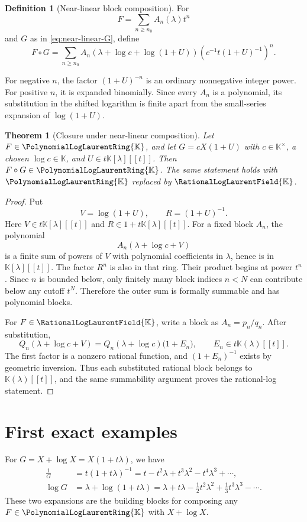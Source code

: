 \documentclass[11pt,openany]{book}
\theoremstyle{definition}
\newtheorem{definition}{Definition}[chapter]
\theoremstyle{plain}
\newtheorem{theorem}{Theorem}[chapter]
\theoremstyle{remark}
\newcommand{\K}{\mathbb{K}}
\newcommand{\Plog}{\PolynomialLogLaurentRing{\K}}
\newcommand{\Rlog}{\RationalLogLaurentField{\K}}
\begin{document}
\begin{definition}[Near-linear block composition]\label{def:near-linear-composition}
For
\[
 F=\sum_{n\ge n_0}A_n(\lambda)t^n
\]
and \(G\) as in \cref{eq:near-linear-G}, define
\begin{equation}\label{eq:exact-block-composition}
 F\circ G
 =\sum_{n\ge n_0}
 A_n\!\left(\lambda+\log c+\log(1+U)\right)
 \left(c^{-1}t(1+U)^{-1}\right)^n.
\end{equation}
\end{definition}
For negative \(n\), the factor \((1+U)^{-n}\) is an ordinary nonnegative integer power. For positive \(n\), it is expanded binomially. Since every \(A_n\) is a polynomial, its substitution in the shifted logarithm is finite apart from the small-series expansion of \(\log(1+U)\).

\begin{theorem}[Closure under near-linear composition]\label{thm:near-linear-closure}
Let \(F\in\Plog\), and let \(G=cX(1+U)\) with \(c\in\K^\times\), a chosen \(\log c\in\K\), and \(U\in t\K[\lambda][[t]]\). Then \(F\circ G\in\Plog\). The same statement holds with \(\Plog\) replaced by \(\Rlog\).
\end{theorem}

\begin{proof}
Put
\[
 V=\log(1+U),\qquad R=(1+U)^{-1}.
\]
Here \(V\in t\K[\lambda][[t]]\) and \(R\in1+t\K[\lambda][[t]]\). For a fixed block \(A_n\), the polynomial
\[
 A_n(\lambda+\log c+V)
\]
is a finite sum of powers of \(V\) with polynomial coefficients in \(\lambda\), hence is in \(\K[\lambda][[t]]\). The factor \(R^n\) is also in that ring. Their product begins at power \(t^n\). Since \(n\) is bounded below, only finitely many block indices \(n<N\) can contribute below any cutoff \(t^N\). Therefore the outer sum is formally summable and has polynomial blocks.

For \(F\in\Rlog\), write a block as \(A_n=p_n/q_n\). After substitution,
\[
 Q_n(\lambda+\log c+V)
 =Q_n(\lambda+\log c)\bigl(1+E_n\bigr),
 \qquad E_n\in t\K(\lambda)[[t]].
\]
The first factor is a nonzero rational function, and \((1+E_n)^{-1}\) exists by geometric inversion. Thus each substituted rational block belongs to \(\K(\lambda)[[t]]\), and the same summability argument proves the rational-log statement.
\end{proof}

\section{First exact examples}
For \(G=X+\log X=X(1+t\lambda)\), we have
\begin{align}
 \frac1G&=t(1+t\lambda)^{-1}
 =t-t^2\lambda+t^3\lambda^2-t^4\lambda^3+\cdots,
 \label{eq:inverse-XlogX}\\
 \log G&=\lambda+\log(1+t\lambda)
 =\lambda+t\lambda-\frac12t^2\lambda^2
 +\frac13t^3\lambda^3-\cdots.
 \label{eq:log-XlogX}
\end{align}
These two expansions are the building blocks for composing any \(F\in\Plog\) with \(X+\log X\).
\end{document}
